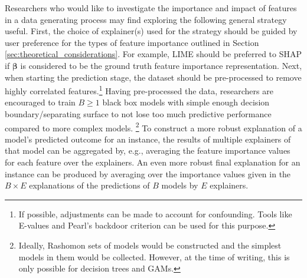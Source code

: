 \documentclass[mnsc,blindrev]{informs3}
\begin{document}
            Researchers who would like to investigate the importance and impact of features in a data generating process may find exploring the following general strategy useful. First, the choice of explainer(s) used for the strategy should be guided by user preference for the types of feature importance outlined in Section \ref{sec:theoretical_considerations}. For example, LIME should be preferred to SHAP if  $\boldsymbol{\beta}$ is considered to be the ground truth feature importance representation.  %
            Next, when starting the prediction stage, the dataset should be pre-processed to remove highly correlated features.\footnote{If possible, adjustments can be made to account for confounding. Tools like E-values\citep{gaster2023quantifying} and Pearl's backdoor criterion can be used for this purpose.} %
            Having pre-processed the data, researchers are encouraged to train $B\geq 1$ black box models with simple enough decision boundary/separating surface to not lose too much predictive performance compared to more complex models. \footnote{Ideally, Rashomon sets of models would be constructed and the simplest models in them would be collected. However, at the time of writing, this is only possible for decision trees and GAMs.} To construct a more robust explanation of a model's predicted outcome for an instance, the results of multiple explainers of that model can be aggregated by, e.g., averaging the feature importance values for each feature over the explainers. An even more robust final explanation for an instance can be  produced by averaging over the importance values given in the $B\times E$ explanations of the predictions of $B$ models by $E$ explainers.
          
\end{document}
